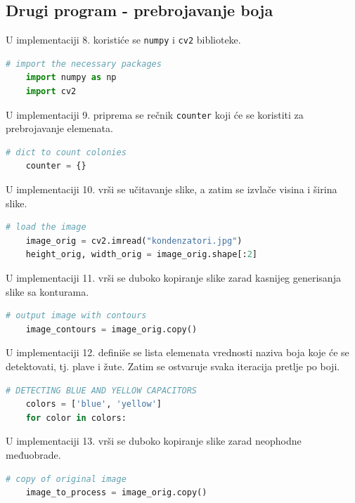 \documentclass[fontsize=12bp, paper=a4]{scrarticle}
\begin{document}
\subsection*{Drugi program - prebrojavanje boja}
U implementaciji 8. koristiće se \verb|numpy| i \verb|cv2| biblioteke.\cite{colonies}

\begin{lstlisting}[language=Python, caption={Uključivanje biblioteka}]
    # import the necessary packages
    import numpy as np
    import cv2
\end{lstlisting}

U implementaciji 9. priprema se rečnik \verb|counter| koji će se koristiti za prebrojavanje elemenata.

\begin{lstlisting}[language=Python, caption={Iniciranje rečnikom}]
    # dict to count colonies
    counter = {}
\end{lstlisting}

U implementaciji 10. vrši se učitavanje slike, a zatim se izvlače visina i širina slike.

\begin{lstlisting}[language=Python, caption={Učitavanje slike}]
    # load the image
    image_orig = cv2.imread("kondenzatori.jpg")
    height_orig, width_orig = image_orig.shape[:2]
\end{lstlisting}

U implementaciji 11. vrši se duboko kopiranje slike zarad kasnijeg generisanja slike sa konturama.
\begin{lstlisting}[language=Python, caption={Duboko kopiranje slike}]
    # output image with contours
    image_contours = image_orig.copy()
\end{lstlisting}

U implementaciji 12. definiše se lista elemenata vrednosti naziva boja koje će se detektovati, tj. plave i žute. Zatim se ostvaruje svaka iteracija pretlje po boji.

\begin{lstlisting}[language=Python, caption={Započeto iteriranje po bojama}]
    # DETECTING BLUE AND YELLOW CAPACITORS
    colors = ['blue', 'yellow']
    for color in colors:
\end{lstlisting}

U implementaciji 13. vrši se duboko kopiranje slike zarad neophodne međuobrade.

\begin{lstlisting}[language=Python, caption={Duboko kopiranje}]
    # copy of original image
    image_to_process = image_orig.copy()
\end{lstlisting}
\end{document}
